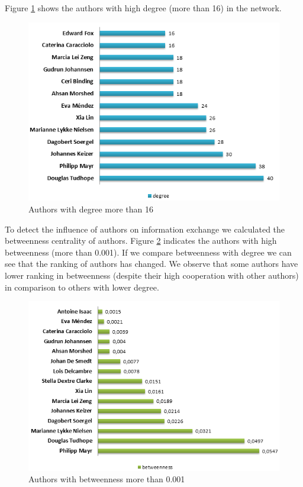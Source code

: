 \documentclass[runningheads,a4paper]{llncs}
\begin{document}
Figure \ref{fig:degree16} shows the authors with high degree (more than 16) in the network. 

\begin{figure}[H]
	\centering
	\includegraphics[width=0.8\linewidth]{degree16}
	\caption{Authors with degree more than 16}
	\label{fig:degree16}
\end{figure}


To detect the influence of authors on information exchange we calculated the betweenness centrality of authors. Figure \ref{fig:betweenness} indicates the authors with high betweenness (more than 0.001). If we compare betweenness with degree we can see that the ranking of authors has changed. We observe that some authors have lower ranking in betweenness (despite their high cooperation with other authors) in comparison to others with lower degree. 


\begin{figure}
\centering
\includegraphics[width=0.8\linewidth]{betweenness}
\caption{Authors with betweenness more than 0.001}
\label{fig:betweenness}
\end{figure}
\end{document}
